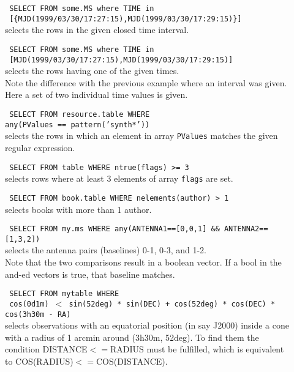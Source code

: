 \begin{description}
   \item[] \texttt{ SELECT FROM some.MS where TIME in }
     \\\texttt{ [\{MJD(1999/03/30/17:27:15),MJD(1999/03/30/17:29:15)\}] }
     \\selects the rows in the given closed time interval.

   \item[] \texttt{ SELECT FROM some.MS where TIME in }
     \\\texttt{ [MJD(1999/03/30/17:27:15),MJD(1999/03/30/17:29:15)] }
     \\selects the rows having one of the given times.
     \\Note the difference with the previous example where an interval
     was given. Here a set of two individual time values is given.

  \item[] \texttt{ SELECT FROM resource.table WHERE}
     \\\texttt{any(PValues == pattern('synth*'))}
     \\selects the rows in which an element in array
     \texttt{PValues} matches the given regular expression.

  \item[] \texttt{ SELECT FROM table WHERE ntrue(flags) >= 3}
     \\selects rows where at least 3 elements of array \texttt{flags}
     are set.

  \item[] \texttt{ SELECT FROM book.table WHERE nelements(author) > 1}
     \\selects books with more than 1 author.

  \item[] \texttt{ SELECT FROM my.ms WHERE
         any(ANTENNA1==[0,0,1] \&\& ANTENNA2==[1,3,2])}
     \\selects the antenna pairs (baselines) 0-1, 0-3, and 1-2.
     \\Note that the two comparisons result in a boolean vector. If
       a bool in the and-ed vectors is true, that baseline matches.

  \item[] \texttt{ SELECT FROM mytable WHERE}
     \\\texttt{ cos(0d1m) $<$
         sin(52deg) * sin(DEC) + cos(52deg) * cos(DEC) *
         cos(3h30m - RA) }
     \\selects observations with an equatorial position (in say J2000)
     inside a cone with a radius of 1 arcmin around (3h30m, 52deg).
     To find them the condition DISTANCE$<=$RADIUS must be fulfilled,
     which is equivalent to COS(RADIUS)$<=$COS(DISTANCE).


\end{description}
